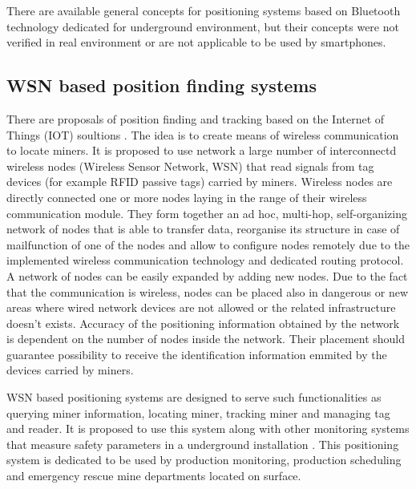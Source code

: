 \documentclass[../main.tex]{subfiles}
\begin{document}
There are available general concepts for positioning systems based on Bluetooth technology dedicated for underground environment, but their concepts were not verified in real environment \cite{thesis_tablet_positioning}\cite{positioning_tests} or are not applicable to be used by smartphones\cite{article_inertial_active_beacons_calculus_kalman}.



\subsection{WSN based position finding systems} %
\label{sub:wsn_based_position_finding_systems}

There are proposals of position finding and tracking based on the Internet of Things (IOT) soultions \cite{WSN_tracking, WSN_monitoring}. The idea is to create means of wireless communication to locate miners. It is proposed to use network a large number of interconnectd wireless nodes (Wireless Sensor Network, WSN) that read signals from tag devices (for example RFID passive tags) carried by miners. Wireless nodes are directly connected one or more nodes laying in the range of their wireless communication module. They form together an ad hoc, multi-hop, self-organizing network of nodes that is able to transfer data, reorganise its structure in case of mailfunction of one of the nodes and allow to configure nodes remotely due to the implemented wireless communication technology and dedicated routing protocol. A network of nodes can be easily expanded by adding new nodes. Due to the fact that the communication is wireless, nodes can be placed also in dangerous or new areas where wired network devices are not allowed or the related infrastructure doesn't exists. Accuracy of the positioning information obtained by the network is dependent on the number of nodes inside the network. Their placement should guarantee possibility to receive the identification information emmited by the devices carried by miners.

WSN based positioning systems are designed to serve such functionalities as querying miner information, locating miner, tracking miner and managing tag and reader. It is proposed to use this system along with other monitoring systems that measure safety parameters in a underground installation \cite{WSN_monitoring}. This positioning system is dedicated to be used by production monitoring, production scheduling and emergency rescue mine departments located on surface.
\end{document}
